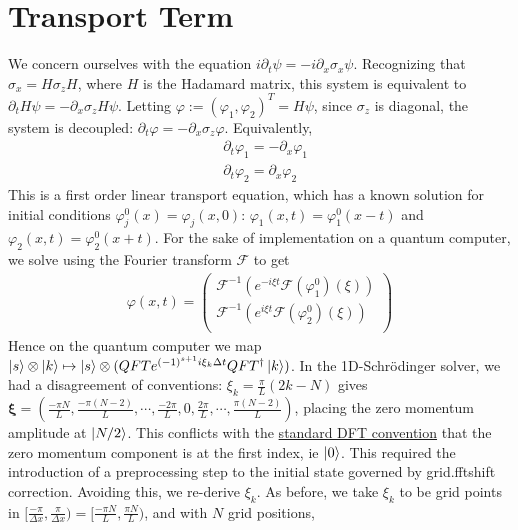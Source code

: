 \documentclass[10pt]{article}
\begin{document}
\section*{Transport Term}
We concern ourselves with the equation $i \partial_t \psi = -i \partial_x \sigma_x \psi$.
Recognizing that $\sigma_x = H \sigma_z H$, where $H$ is the Hadamard matrix, this
system is equivalent to $\partial_t H \psi = -\partial_x \sigma_z H \psi$. Letting
$\varphi := (\varphi_1, \varphi_2)^T = H \psi$, since $\sigma_z$ is diagonal, the system 
is decoupled: $\partial_t \varphi = -\partial_x \sigma_z \varphi$. Equivalently,
\begin{align*}
    &\partial_t \varphi_1 = -\partial_x \varphi_1 \\
    &\partial_t \varphi_2 = \partial_x \varphi_2
\end{align*}
This is a first order linear transport equation, which has a known solution
for initial conditions $\varphi_j^0(x) = \varphi_j(x, 0)$: $\varphi_1(x, t) = \varphi_1^0(x-t)$
and $\varphi_2(x, t) = \varphi_2^0(x+t)$. For the sake of implementation on a quantum computer,
we solve using the Fourier transform $\mathcal{F}$ to get
\begin{align*}
    \varphi(x, t) =
    \begin{pmatrix}
        \mathcal{F}^{-1}(e^{-i \xi t}\mathcal{F}(\varphi_1^0)(\xi)) \\
        \mathcal{F}^{-1}(e^{i \xi t}\mathcal{F}(\varphi_2^0)(\xi)) \\
    \end{pmatrix}
\end{align*}
Hence on the quantum computer we map $\ket{s} \otimes \ket{k} \mapsto \ket{s}
\otimes (QFT e^{(-1)^{s+1} i\xi_k \Delta t} QFT^\dag \ket{k})$. In the 1D-Schrödinger
solver, we had a disagreement of conventions: $\xi_k = \frac{\pi}{L}(2k-N)$ gives
$\mathbf{\xi} = \left(\frac{-\pi N}{L}, \frac{-\pi(N-2)}{L}, \cdots, \frac{-2\pi}{L}, 0,
\frac{2\pi}{L}, \cdots, \frac{\pi(N-2)}{L}\right)$, placing the zero momentum amplitude at 
$\ket{N/2}$. This conflicts with the \href{https://numpy.org/doc/stable/reference/routines.fft.html}
{standard DFT convention} that the zero momentum component is 
at the first index, ie $\ket{0}$. This required the introduction of a preprocessing step to the
initial state governed by grid.fftshift correction. Avoiding this, we re-derive $\xi_k$. As before,
we take $\xi_k$ to be grid points in $\big[\frac{-\pi}{\Delta x}, \frac{\pi}{\Delta x}\big) 
= \big[\frac{-\pi N}{L}, \frac{\pi N}{L}\big)$, and with $N$ grid positions,
\end{document}
